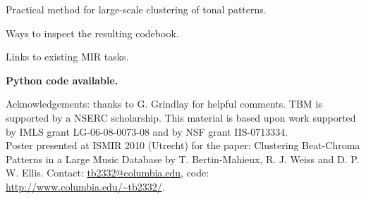 \documentclass[portrait,a0b,final]{a0poster}
\newenvironment{poster}{
  \begin{center}
  \begin{minipage}[c]{0.98\textwidth}
}{
  \end{minipage} 
  \end{center}
}
\newcommand{\myfig}[3][0]{
\begin{center}
  \vspace{1.5cm}
  \texttt{[image: \#2]}
  \nobreak\medskip
\end{center}}
\begin{document}
\begin{poster}
\begin{multicols}{3}
\vspace{1.0cm}

\begin{list}{}{\leftmargin=2em =1em}
\item Practical method for large-scale clustering of tonal patterns.
\item Ways to inspect the resulting codebook.
\item Links to existing MIR tasks.
\item \textbf{Python code available.}
\end{list}

\end{multicols}

\vspace{1.5cm}
\begin{minipage}{\textwidth}
\begin{small}
\begin{flushright}
Acknowledgements: thanks to G. Grindlay for
helpful comments. TBM is supported by a
NSERC scholarship. This material is based upon work
supported by IMLS grant LG-06-08-0073-08 and by NSF
grant IIS-0713334. \\
Poster presented at ISMIR 2010 (Utrecht) for the paper:
Clustering Beat-Chroma Patterns in a Large Music Database by
T. Bertin-Mahieux, R. J. Weiss and D. P. W. Ellis. Contact:
\url{tb2332@columbia.edu}, code: \url{http://www.columbia.edu/~tb2332/}.
\end{flushright}
\end{small}
\end{minipage}

\end{poster}
\end{document}
